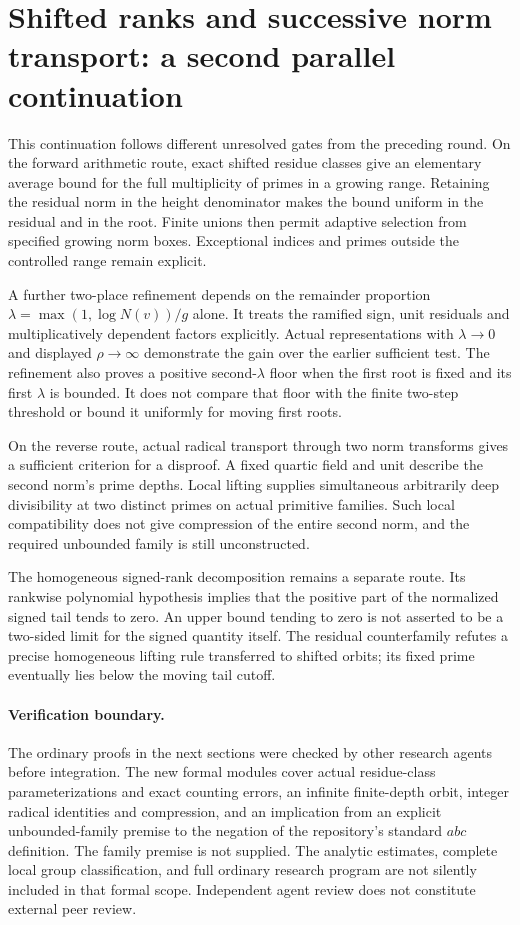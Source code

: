 \section{Shifted ranks and successive norm transport: a second parallel continuation}
\label{sec:rank-transport-continuation}
This continuation follows different unresolved gates from the preceding round.
On the forward arithmetic route, exact shifted residue classes give an
elementary average bound for the full multiplicity of primes in a growing
range. Retaining the residual norm in the height denominator makes the bound
uniform in the residual and in the root. Finite unions then permit adaptive
selection from specified growing norm boxes. Exceptional indices and primes
outside the controlled range remain explicit.

A further two-place refinement depends on the remainder proportion
$\lambda=\max(1,\log N(v))/g$ alone. It treats the ramified sign, unit
residuals and multiplicatively dependent factors explicitly. Actual
representations with $\lambda\to0$ and displayed $\rho\to\infty$ demonstrate
the gain over the earlier sufficient test. The refinement also proves a
positive second-$\lambda$ floor when the first root is fixed and its first
$\lambda$ is bounded. It does not compare that floor with the finite
two-step threshold or bound it uniformly for moving first roots.

On the reverse route, actual radical transport through two norm transforms
gives a sufficient criterion for a disproof. A fixed quartic field and unit
describe the second norm's prime depths. Local lifting supplies simultaneous
arbitrarily deep divisibility at two distinct primes on actual primitive
families. Such local compatibility does not give compression of the entire
second norm, and the required unbounded family is still unconstructed.

The homogeneous signed-rank decomposition remains a separate route. Its
rankwise polynomial hypothesis implies that the positive part of the normalized
signed tail tends to zero. An upper bound tending to zero is not asserted to
be a two-sided limit for the signed quantity itself. The residual counterfamily
refutes a precise homogeneous lifting rule transferred to shifted orbits;
its fixed prime eventually lies below the moving tail cutoff.

\paragraph{Verification boundary.}
The ordinary proofs in the next sections were checked by other research agents
before integration. The new formal modules cover actual residue-class
parameterizations and exact counting errors, an infinite finite-depth orbit,
integer radical identities and compression, and an implication from an
explicit unbounded-family premise to the negation of the repository's standard
$abc$ definition. The family premise is not supplied. The analytic estimates,
complete local group classification, and full ordinary research program are
not silently included in that formal scope. Independent agent review does not
constitute external peer review.


